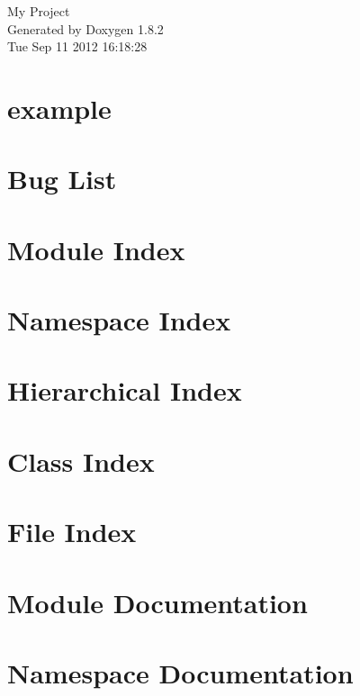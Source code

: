 \documentclass{book}
\begin{document}
\hypersetup{pageanchor=false,citecolor=blue}
\begin{titlepage}
\vspace*{7cm}
\begin{center}
{\Large My Project }\\
\vspace*{1cm}
{\large Generated by Doxygen 1.8.2}\\
\vspace*{0.5cm}
{\small Tue Sep 11 2012 16:18:28}\\
\end{center}
\end{titlepage}
\clearemptydoublepage
{}
\tableofcontents
\clearemptydoublepage
{}
\hypersetup{pageanchor=true,citecolor=blue}
\chapter{example}
\label{example}
\hypertarget{example}{}

\chapter{Bug List}
\label{bug}
\hypertarget{bug}{}

\chapter{Module Index}

\chapter{Namespace Index}

\chapter{Hierarchical Index}

\chapter{Class Index}

\chapter{File Index}

\chapter{Module Documentation}





\chapter{Namespace Documentation}




\end{document}
